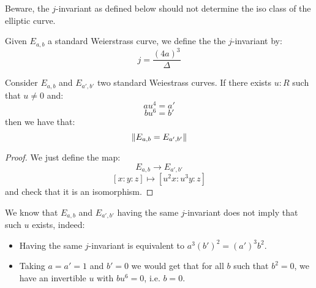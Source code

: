 Beware, the $j$-invariant as defined below should not determine the iso class of the elliptic curve.

\begin{definition}
Given $E_{a,b}$ a standard Weierstrass curve, we define the the $j$-invariant by:
\[j  = \frac{(4a)^3}{\Delta}\] 
\end{definition}

\begin{lemma}
Consider $E_{a,b}$ and $E_{a',b'}$ two standard Weiestrass curves. If there exists $u:R$ such that $u\not=0$ and:
\[au^4 = a'\]
\[bu^6 = b'\]
then we have that:
\[\lVert E_{a,b} = E_{a',b'} \rVert\]
\end{lemma}

\begin{proof}
We just define the map:
\[E_{a,b} \to E_{a',b'}\]
\[[x:y:z] \mapsto [u^2x:u^3y:z]\]
and check that it is an isomorphism.
\end{proof}

\begin{remark}
We know that $E_{a,b}$ and $E_{a',b'}$ having the same $j$-invariant does not imply that such $u$ exists, indeed:
\begin{itemize}
\item Having the same $j$-invariant is equivalent to $a^3(b')^2 = (a')^3b^2$.
\item Taking $a=a'=1$ and $b'=0$ we would get that for all $b$ such that $b^2 = 0$, we have an invertible $u$ with $bu^6 = 0$, i.e. $b=0$.
\end{itemize} 
\end{remark}
